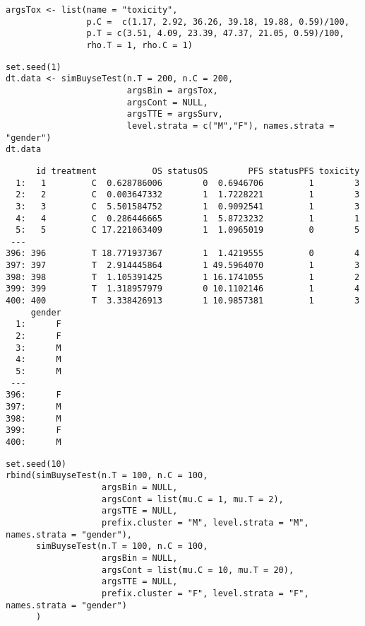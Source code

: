 \documentclass[12pt]{article}
\begin{document}
\lstset{language=r,label= ,caption= ,captionpos=b,numbers=none}
\begin{lstlisting}
argsTox <- list(name = "toxicity",
                p.C =  c(1.17, 2.92, 36.26, 39.18, 19.88, 0.59)/100,
                p.T = c(3.51, 4.09, 23.39, 47.37, 21.05, 0.59)/100,
                rho.T = 1, rho.C = 1)
\end{lstlisting}

\lstset{language=r,label= ,caption= ,captionpos=b,numbers=none}
\begin{lstlisting}
set.seed(1)
dt.data <- simBuyseTest(n.T = 200, n.C = 200,
                        argsBin = argsTox,
                        argsCont = NULL,
                        argsTTE = argsSurv,
                        level.strata = c("M","F"), names.strata = "gender")
dt.data
\end{lstlisting}

\begin{verbatim}
      id treatment           OS statusOS        PFS statusPFS toxicity
  1:   1         C  0.628786006        0  0.6946706         1        3
  2:   2         C  0.003647332        1  1.7228221         1        3
  3:   3         C  5.501584752        1  0.9092541         1        3
  4:   4         C  0.286446665        1  5.8723232         1        1
  5:   5         C 17.221063409        1  1.0965019         0        5
 ---                                                                  
396: 396         T 18.771937367        1  1.4219555         0        4
397: 397         T  2.914445864        1 49.5964070         1        3
398: 398         T  1.105391425        1 16.1741055         1        2
399: 399         T  1.318957979        0 10.1102146         1        4
400: 400         T  3.338426913        1 10.9857381         1        3
     gender
  1:      F
  2:      F
  3:      M
  4:      M
  5:      M
 ---       
396:      F
397:      M
398:      M
399:      F
400:      M
\end{verbatim}


\lstset{language=r,label= ,caption= ,captionpos=b,numbers=none}
\begin{lstlisting}
set.seed(10)
rbind(simBuyseTest(n.T = 100, n.C = 100,
                   argsBin = NULL,
                   argsCont = list(mu.C = 1, mu.T = 2),
                   argsTTE = NULL,
                   prefix.cluster = "M", level.strata = "M", names.strata = "gender"),
      simBuyseTest(n.T = 100, n.C = 100,
                   argsBin = NULL,
                   argsCont = list(mu.C = 10, mu.T = 20),
                   argsTTE = NULL,
                   prefix.cluster = "F", level.strata = "F", names.strata = "gender")
      )
\end{lstlisting}
\end{document}
